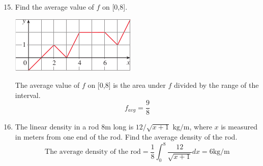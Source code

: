 \documentclass[12pt]{article}
\begin{document}
\begin{enumerate}
\setcounter{enumi}{14}  
    \item Find the average value of $f$ on [0,8].
    \begin{center}
        \includegraphics{img/img-2.png}
    \end{center}
    The average value of $f$ on [0,8] is the area under $f$ divided by the range of the interval.
    \[f_{avg} = \frac{9}{8}\]

\setcounter{enumi}{18}
    \item The linear density in a rod 8m long is $12/\sqrt{x+1} \text{ kg/m}$, where $x$ is measured in meters from one end of the rod. Find the average density of the rod.
    \[\text{The average density of the rod} = \frac{1}{8} \int_0^8 \frac{12}{\sqrt{x+1}}dx = 6\text{kg/m}\]

\end{enumerate}
\end{document}
